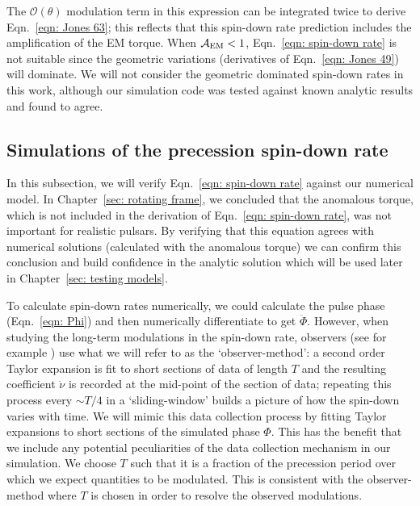 \documentclass[../full_thesis/full_thesis.tex]{subfiles}
\begin{document}
The $\mathcal{O}(\theta)$ modulation term in this expression can be integrated
twice to derive Eqn.~\eqref{eqn: Jones 63}; this reflects that this
spin-down rate prediction includes the amplification of the EM torque. When
$\mathcal{A}_{\mathrm{EM}} < 1$, Eqn.~\eqref{eqn: spin-down rate} is not suitable since the
geometric variations (derivatives of Eqn.~\eqref{eqn: Jones 49}) will dominate.
We will not consider the geometric dominated spin-down rates in this work,
although our simulation code was tested against known analytic results and
found to agree.

\subsection{Simulations of the precession spin-down rate}
\label{sec: spin-down rate numerical}

In this subsection, we will verify Eqn.~\eqref{eqn: spin-down rate} against our
numerical model. In Chapter~\ref{sec: rotating frame}, we concluded that the
anomalous torque, which is not included in the derivation of Eqn.~\eqref{eqn:
spin-down rate}, was not important for realistic pulsars. By verifying that
this equation agrees with numerical solutions (calculated with the anomalous
torque) we can confirm this conclusion and build confidence in the analytic
solution which will be used later in Chapter~\ref{sec: testing models}.

 To calculate spin-down rates numerically, we could calculate the pulse phase
(Eqn.~\eqref{eqn: Phi}) and then numerically differentiate to get
$\ddot{\Phi}$. However, when studying the long-term modulations in the spin-down
rate, observers (see for example \citet{Lyne2010, Perera2015}) use what we will
refer to as the `observer-method': a second order Taylor expansion is
fit to short sections of data of length $T$ and the resulting coefficient
$\dot{\nu}$ is recorded at the mid-point of the section of data; repeating
this process every $\sim T/4$ in a `sliding-window' builds a picture of how the
spin-down varies with time.  We will mimic this data collection process by
fitting Taylor expansions to short sections of the simulated phase $\Phi$. This
has the benefit that we include any potential peculiarities of the data
collection mechanism in our simulation.  We choose $T$ such that it is a
fraction of the precession period over which we expect quantities to be
modulated. This is consistent with the observer-method where $T$ is chosen in
order to resolve the observed modulations.
\end{document}
